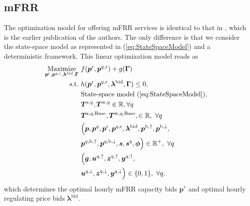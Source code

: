 \documentclass[sigconf]{acmart}
\begin{document}
\subsection{mFRR}

The optimization model for offering mFRR services is identical to that in \cite{gade2023load}, which is the earlier publication of the authors. The only difference is that we consider the state-space model as represented in  (\ref{eq:StateSpaceModel}) and a deterministic framework. This linear optimization model reads as  
%
%
\begin{subequations}\label{P1:compact_model_mfrr}
    \begin{align}
        \underset{\bm{p}^{\rm{r}}, \bm{p}^{q,\rm{r}}, \bm{\lambda}^{\rm{bid}}, \bm{\Gamma}}{\text{Maximize}} \  & f(\bm{p}^{\rm{r}}, \bm{p}^{q,\rm{r}}) + g(\bm{\Gamma}) \label{P1:eq1_mfrr}
        \\
        \text{s.t.} \                                                                                           & h(\bm{p}^{\rm{r}}, \bm{p}^{q,\rm{r}}, \bm{\lambda}^{\rm{bid}}, \bm{\Gamma}) \leq 0, \label{P1:eq2_mfrr}                                              \\
        \                                                                                                       & \text{State-space model } (\ref{eq:StateSpaceModel}),  \label{P1:eq3_mfrr}
        \\
        \                                                                                                       & \bm{T}^{\text{z},q}, \bm{T}^{\text{w},q} \in \mathbb{R}, \forall{q} \label{P1:eq4_mfrr}
        \\
        \                                                                                                       & \bm{T}^{\text{z},q,\text{Base}}, \bm{T}^{\text{w},q,\text{Base}}, \in \mathbb{R}, \ \forall{q} \label{P1:eq5_mfrr}
        \\
        \                                                                                                       & \Bigl( \bm{p}, \bm{p}^{q}, \bm{p}^{\rm{r}}, \bm{p}^{q,\rm{r}}, \bm{\lambda}^{\rm{bid}}, \bm{p}^{\rm{b},\uparrow}, \bm{p}^{\rm{b},\downarrow}, \notag \\ & \bm{p}^{q,\rm{b},\uparrow}, \bm{p}^{q,\rm{b},\downarrow}, \bm{s}, \bm{s}^{q}, \bm{\phi} \Bigr) \in \mathbb{R}^{+}, \ \forall{q}  \label{P1:eq6_mfrr}
        \\
        \                                                                                                       & \Bigl( \bm{g}, \bm{u}^{q,\uparrow}, \bm{z}^{q,\uparrow}, \bm{y}^{q,\uparrow}, \notag                                                                 \\ & \bm{u}^{q,\downarrow}, \bm{z}^{q,\downarrow}, \bm{y}^{q,\downarrow} \Bigr) \in \{0,1\}, \ \forall{q}, \label{P1:eq7_mfrr}
    \end{align}
\end{subequations}
\endgroup
which determines the optimal hourly mFRR capacity bids $\bm{p}^{r}$ and optimal hourly regulating price bids $\bm{\lambda}^{\text{bid}}$. 
\end{document}

